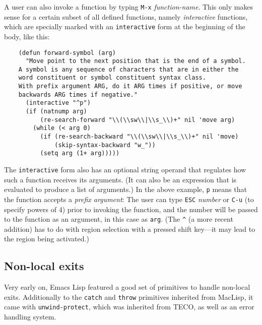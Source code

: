 \documentclass[format=acmsmall, review]{acmart}
\newcommand \Elisp {Emacs Lisp}
\begin{document}
A user can also invoke a function by typing \texttt{M-x}
\emph{function-name}.  This only makes sense for a certain subset of
all defined functions, namely \emph{interactive} functions, which
are specially marked with an \texttt{interactive} form at the
beginning of the body, like this:
\begin{verbatim}
    (defun forward-symbol (arg)
      "Move point to the next position that is the end of a symbol.
    A symbol is any sequence of characters that are in either the
    word constituent or symbol constituent syntax class.
    With prefix argument ARG, do it ARG times if positive, or move
    backwards ARG times if negative."
      (interactive "^p")
      (if (natnump arg)
          (re-search-forward "\\(\\sw\\|\\s_\\)+" nil 'move arg)
        (while (< arg 0)
          (if (re-search-backward "\\(\\sw\\|\\s_\\)+" nil 'move)
              (skip-syntax-backward "w_"))
          (setq arg (1+ arg)))))
\end{verbatim}
The \texttt{interactive} form also has an optional string operand that
regulates how such a function receives its arguments.  (It can also be
an expression that is evaluated to produce a list of arguments.)  In the above
example, \verb|p| means that the function accepts a \emph{prefix
  argument}: The user can type \texttt{ESC} \emph{number} or
\texttt{C-u} (to specify powers of 4) prior to invoking the function,
and the number will be passed to the function as an argument, in this
case as \texttt{arg}.  (The \verb|^| (a more recent addition) has to do with
region selection with a pressed shift key---it may lead to the region
being activated.)

\subsection{Non-local exits}
\label{sec:non-local-exits}

Very early on, \Elisp{} featured a good set of primitives to handle
non-local exits.  Additionally to the \texttt{catch} and \texttt{throw}
primitives inherited from MacLisp, it came with \texttt{unwind-protect},
which was inherited from TECO, as well as an error handling system.
\end{document}

